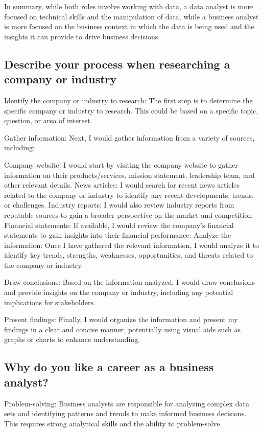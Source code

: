 \documentclass[12pt, a4paper, oneside]{article}
\begin{document}
In summary, while both roles involve working with data, a data analyst is more focused on technical skills and the manipulation of data, while a business analyst is more focused on the business context in which the data is being used and the insights it can provide to drive business decisions.
\subsection{ Describe your process when researching a company or industry }
Identify the company or industry to research: The first step is to determine the specific company or industry to research. This could be based on a specific topic, question, or area of interest.

Gather information: Next, I would gather information from a variety of sources, including:

Company website: I would start by visiting the company website to gather information on their products/services, mission statement, leadership team, and other relevant details.
News articles: I would search for recent news articles related to the company or industry to identify any recent developments, trends, or challenges.
Industry reports: I would also review industry reports from reputable sources to gain a broader perspective on the market and competition.
Financial statements: If available, I would review the company's financial statements to gain insights into their financial performance.
Analyze the information: Once I have gathered the relevant information, I would analyze it to identify key trends, strengths, weaknesses, opportunities, and threats related to the company or industry.

Draw conclusions: Based on the information analyzed, I would draw conclusions and provide insights on the company or industry, including any potential implications for stakeholders.

Present findings: Finally, I would organize the information and present my findings in a clear and concise manner, potentially using visual aids such as graphs or charts to enhance understanding.
\subsection{ Why do you like a career as a business analyst?   }
Problem-solving: Business analysts are responsible for analyzing complex data sets and identifying patterns and trends to make informed business decisions. This requires strong analytical skills and the ability to problem-solve.
\end{document}
